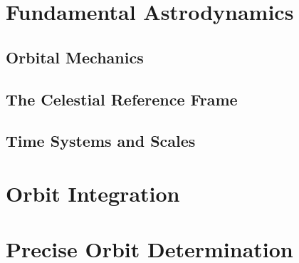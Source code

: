 \documentclass[12pt,a4paper,twoside]{report}
\begin{document}
\chapter{Fundamental Astrodynamics}\label{ch:fundamental-astrodynamics}
    
  \section{Orbital Mechanics}\label{ssec:orbital-mechanics}
    
    
    
      
      
      
      
      
      
      

    \section{The Celestial Reference Frame}\label{ssec:the-celestial-reference-frame}
      
      
      
      
    
    \section{Time Systems and Scales}\label{ssec:time-systems-and-scales}
      
      

\chapter{Orbit Integration}\label{ch:orbit-integration}
  
  
  
  
    

\chapter{Precise Orbit Determination}\label{ch:pod}
  
    
  
    
    
  
  
  
  
\end{document}
